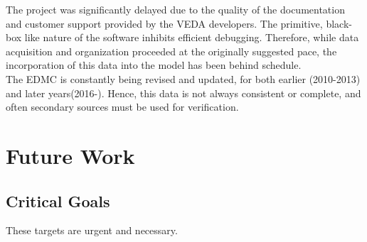 \documentclass[14pt,a4paper]{article} %
\begin{document}
The project was significantly delayed due to the quality of the documentation and customer support provided by the VEDA developers. The primitive, black-box like nature of the software inhibits efficient debugging. Therefore, while data acquisition and organization proceeded at the originally suggested pace, the incorporation of this data into the model has been behind schedule. \\

The \gls{EDMC} is constantly being revised and updated, for both earlier (2010-2013) and later years(2016-). Hence, this data is not always consistent or complete, and often secondary sources must be used for verification.
\section{Future Work} 

\subsection{Critical Goals}
These targets are urgent and necessary.
\end{document}
